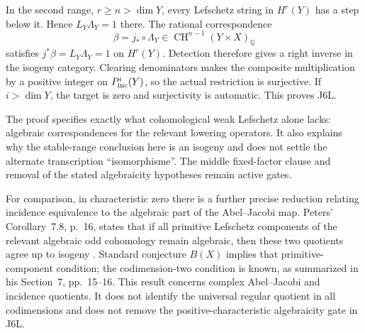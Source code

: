 In the second range, $r\geq n>\dim Y$, every Lefschetz string in
$H^r(Y)$ has a step below it. Hence $L_Y\Lambda_Y=1$ there.
The rational correspondence
\[
 \beta=j_*\circ\Lambda_Y\in
           \operatorname{CH}^{n-1}(Y\times X)_{\mathbb Q}
\]
satisfies $j^*\beta=L_Y\Lambda_Y=1$ on $H^r(Y)$. Detection
therefore gives a right inverse in the isogeny category.
Clearing denominators makes the composite multiplication by a
positive integer on $P^i_{\rm inc}(Y)$, so the actual
restriction is surjective. If $i>\dim Y$, the target is zero
and surjectivity is automatic. This proves J6L.

The proof specifies exactly what cohomological weak Lefschetz
alone lacks: algebraic correspondences for the relevant lowering
operators. It also explains why the stable-range conclusion here
is an isogeny and does not settle the alternate transcription
``isomorphisme''. The middle fixed-factor clause and removal of
the stated algebraicity hypotheses remain active gates.

For comparison, in characteristic zero there is a further precise
reduction relating incidence equivalence to the algebraic part of
the Abel--Jacobi map. Peters' Corollary~7.8, p.~16, states that
if all primitive Lefschetz components of the relevant algebraic
odd cohomology remain algebraic, then these two quotients agree
up to isogeny \cite{DGJ_Peters2026}. Standard conjecture $B(X)$
implies that primitive-component condition; the codimension-two
condition is known, as summarized in his Section~7, pp.~15--16.
This result concerns complex Abel--Jacobi and incidence quotients.
It does not identify the universal regular quotient in all
codimensions and does not remove the positive-characteristic
algebraicity gate in J6L.
